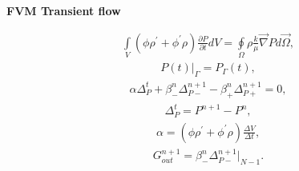 \documentclass[a4paper,12pt]{extreport}
\begin{document}
\begin{multicols}{2}
        \columnbreak
        \begin{center}
        {\large \textbf{FVM Transient flow}}
        \end{center}
        \begin{eqnarray}
            \label{eq:conductivity_integral}
            \int \limits_{V} \left( \phi \rho^\prime + \phi^\prime \rho \right) \frac{\partial P}{\partial t} d V = \oint \limits_{\Omega} \rho \frac{k}{\mu} \vec{\nabla}P d\vec{\Omega},
        \end{eqnarray}
       \vspace{-0.5cm}
        \begin{eqnarray}
            \label{eq:conductivity_bound}
            P\left(t\right) \Big|_\Gamma = P_\Gamma\left(t\right),
        \end{eqnarray}
        \begin{eqnarray}
            \label{eq:conductivity_num}
            \alpha \Delta^{t}_{P} + \beta^n_{-}\Delta^{n+1}_{P-} - \beta^n_{+}\Delta^{n+1}_{P+}= 0,
        \end{eqnarray}
        \begin{eqnarray}
            \label{eq:delta_P_t_num}
            \Delta^{t}_{P} = P^{n+1} - P^{n},
        \end{eqnarray}
        \begin{eqnarray}
            \label{eq:alpha}
            \alpha = \left( \phi \rho^\prime + \phi^\prime \rho \right) \frac{\Delta V}{\Delta t},
        \end{eqnarray}
        \begin{eqnarray}
            \label{eq:Consumption_conductivity_integral}
            G_{out}^{n+1} = \beta^n_-\Delta^{n+1}_{P-} \Big|_ {N-1}.                        
        \end{eqnarray}
    \end{multicols}

    \vspace{1.cm}
\end{document}
